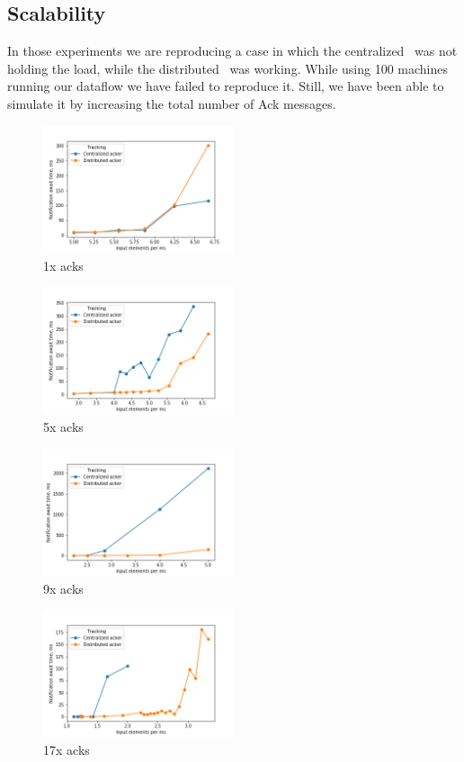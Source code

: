 \subsection{Scalability}

In those experiments we are reproducing a case in which the centralized \tracker\ was not holding the load, while the distributed \tracker\ was working. While using 100 machines running our dataflow we have failed to reproduce it. Still, we have been able to simulate it by increasing the total number of Ack messages.

\begin{figure}[htbp]
  \centering
  \includegraphics[width=0.50\textwidth]{scalability_01x.png}
  \caption{1x acks}
\end{figure}
\begin{figure}[htbp]
  \centering
  \includegraphics[width=0.50\textwidth]{scalability_05x.png}
  \caption{5x acks}
\end{figure}
\begin{figure}[htbp]
  \centering
  \includegraphics[width=0.50\textwidth]{scalability_09x.png}
  \caption{9x acks}
\end{figure}
\begin{figure}[htbp]
  \centering
  \includegraphics[width=0.50\textwidth]{scalability_17x.png}
  \caption{17x acks}
\end{figure}

